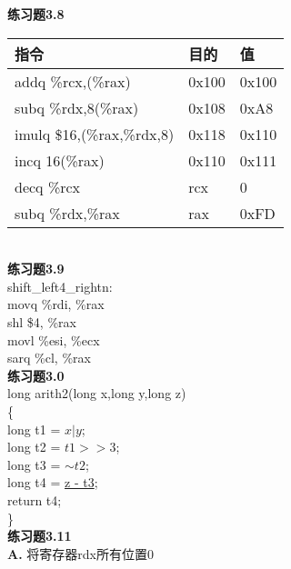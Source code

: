 \documentclass{article}
\begin{document}
\begin{CJK}{UTF8}{uyhei}
\textbf{练习题3.8}	\\[2ex]
\begin{table}[htbp]
\centering
\begin{tabular}{|m{18em}<{\centering}|m{10em}<{\centering}|m{10em}<{\centering}|}
	\hline
	指令	&	目的	&	值	\\
	\hline
	addq \%rcx,(\%rax)	&	0x100	&	0x100	\\
	\hline
	subq \%rdx,8(\%rax)	&	0x108	&	0xA8	\\
	\hline
	imulq \$16,(\%rax,\%rdx,8)	&	0x118	&	0x110	\\
	\hline
	incq 16(\%rax)	&	0x110	&	0x111	\\
	\hline
	decq \%rcx	&	rcx	&	0	\\
	\hline
	subq \%rdx,\%rax	&	rax	&	0xFD	\\
	\hline
\end{tabular}
\end{table}	\\[2ex]
\newpage
\noindent\textbf{练习题3.9}	\\[2ex]
shift\_left4\_rightn:	\\
\hspace*{1em} movq \%rdi, \%rax	\\
\hspace*{1em} shl \$4, \%rax	\\
\hspace*{1em} movl \%esi, \%ecx	\\
\hspace*{1em} sarq \%cl, \%rax	\\[3ex]
\textbf{练习题3.0}	\\[2ex]
long arith2(long x,long y,long z)	\\
\{	\\
\hspace*{2em}	long t1 = \underline{$x | y$};	\\
\hspace*{2em}	long t2 = \underline{$t1 >> 3$};	\\
\hspace*{2em}	long t3 = \underline{$\sim{t2}$};	\\
\hspace*{2em}	long t4 = \underline{z - t3};	\\
\hspace*{2em}	return t4;	\\
\}	\\[3ex]
\textbf{练习题3.11}	\\[2ex]
\textbf{A.} 将寄存器rdx所有位置0	\\

\end{CJK}
\end{document}
